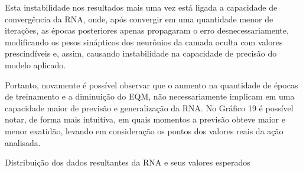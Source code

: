 Esta instabilidade nos resultados mais uma vez está ligada a capacidade de convergência da RNA, onde, após convergir em uma quantidade menor de iterações, as épocas posteriores apenas propagaram o erro desnecessariamente, modificando os pesos sinápticos dos neurônios da camada oculta com valores prescindíveis e, assim, causando instabilidade na capacidade de precisão do modelo aplicado. 

Portanto, novamente é possível observar que o aumento na quantidade de épocas de treinamento e a diminuição do EQM, não necessariamente implicam em uma capacidade maior de previsão e generalização da RNA. No Gráfico 19 é possível notar, de forma mais intuitiva, em quais momentos a previsão obteve maior e menor exatidão, levando em consideração os pontos dos valores reais da ação analisada.
\begin{grafico}[h]
	\centering
	\caption{Distribuição dos dados resultantes da RNA e seus valores esperados}
	\label{lingua}
\end{grafico}